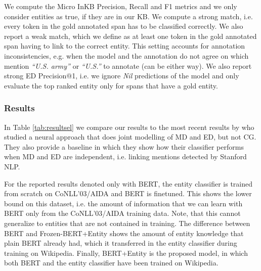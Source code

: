 \documentclass[11pt,a4paper]{article}
\begin{document}
We compute the Micro InKB Precision, Recall and F1 metrics and we only consider entities as true, if they are in our KB. We compute a strong match, i.e. every token in the gold annotated span has to be classified correctly. We also report a weak match, which we define as at least one token in the gold annotated span having to link to the correct entity. This setting accounts for annotation inconsistencies, e.g. when the model and the annotation do not agree on which mention \textit{``U.S. army''} or \textit{``U.S.''} to annotate (can be either way). We also report strong ED Precision@1, i.e. we ignore \textit{Nil} predictions of the model and only evaluate the top ranked entity only for spans that have a gold entity. 

\subsubsection{Results}

In Table \ref{tab:resultsel} we compare our results to the most recent results by \citet{kolitsas-etal-2018-end/Ganea} who studied a neural approach that does joint modelling of MD and ED, but not CG. They also provide a baseline in which they show how their classifier performs when MD and ED are independent, i.e. linking mentions detected by Stanford NLP. 

For the reported results denoted only with BERT, the entity classifier is trained from scratch on CoNLL’03/AIDA and BERT is finetuned. This shows the lower bound on this dataset, i.e. the amount of information that we can learn with BERT only from the CoNLL’03/AIDA training data. Note, that this cannot generalize to entities that are not contained in training. The difference between BERT and Frozen-BERT+Entity shows the amount of entity knowledge that plain BERT already had, which it transferred in the entity classifier during training on Wikipedia. Finally, BERT+Entity is the proposed model, in which both BERT and the entity classifier have been trained on Wikipedia.
\end{document}
